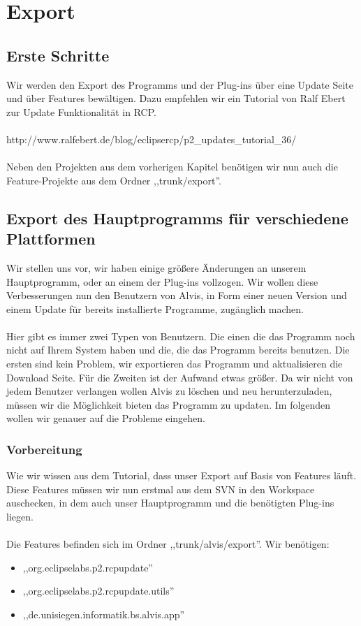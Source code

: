 \documentclass[10pt,a4paper]{article}
\begin{document}
\newpage
\section{Export}
\subsection{Erste Schritte}
Wir werden den Export des Programms und der Plug-ins über eine Update Seite und über Features bewältigen. Dazu empfehlen wir ein Tutorial von Ralf Ebert zur Update Funktionalität in RCP.
\\ \\
http://www.ralfebert.de/blog/eclipsercp/p2\_updates\_tutorial\_36/
\\ \\
Neben den Projekten aus dem vorherigen Kapitel benötigen wir nun auch die Feature-Projekte aus dem Ordner ,,trunk/export''.

\subsection{Export des Hauptprogramms für verschiedene Plattformen}
Wir stellen uns vor, wir haben einige größere Änderungen an unserem Hauptprogramm, oder an einem der Plug-ins vollzogen. Wir wollen diese Verbesserungen nun den Benutzern von Alvis, in Form einer neuen Version und einem Update für bereits installierte Programme, zugänglich machen. 
\\ \\
Hier gibt es immer zwei Typen von Benutzern. Die einen die das Programm noch nicht auf Ihrem System haben und die, die das Programm bereits benutzen. Die ersten sind kein Problem, wir exportieren das Programm und aktualisieren die Download Seite. Für die Zweiten ist der Aufwand etwas größer. Da wir nicht von jedem Benutzer verlangen wollen Alvis zu löschen und neu herunterzuladen, müssen wir die Möglichkeit bieten das Programm zu updaten. Im folgenden wollen wir genauer auf die Probleme eingehen.
\subsubsection{Vorbereitung}
Wie wir wissen aus dem Tutorial, dass unser Export auf Basis von Features läuft. Diese Features müssen wir nun erstmal aus dem SVN in den Workspace auschecken, in dem auch unser Hauptprogramm und die benötigten Plug-ins liegen.
\\ \\
Die Features befinden sich im Ordner ,,trunk/alvis/export''.
Wir benötigen:
\begin{itemize}
\item ,,org.eclipselabs.p2.rcpupdate''
\item ,,org.eclipselabs.p2.rcpupdate.utils''
\item ,,de.unisiegen.informatik.bs.alvis.app''
\end{itemize}
\end{document}
